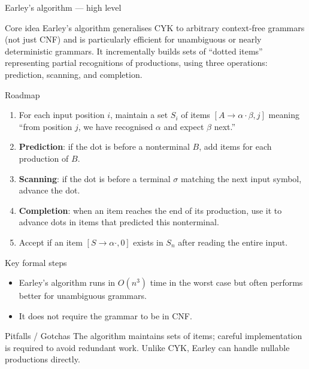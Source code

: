 \begin{frame}[t]{Earley’s algorithm — high level}
  \begin{tblock}{Core idea}
    Earley’s algorithm generalises CYK to arbitrary context‑free
    grammars (not just CNF) and is particularly efficient for
    unambiguous or nearly deterministic grammars.  It incrementally
    builds sets of “dotted items” representing partial recognitions of
    productions, using three operations: prediction, scanning, and
    completion.
  \end{tblock}
  \begin{tblock}{Roadmap}
    \begin{enumerate}
      \item For each input position $i$, maintain a set $S_i$ of items
        $[A \rightarrow \alpha \cdot \beta, j]$ meaning “from position
        $j$, we have recognised $\alpha$ and expect $\beta$ next.”
      \item \textbf{Prediction}: if the dot is before a nonterminal $B$,
        add items for each production of $B$.
      \item \textbf{Scanning}: if the dot is before a terminal $\sigma$
        matching the next input symbol, advance the dot.
      \item \textbf{Completion}: when an item reaches the end of its
        production, use it to advance dots in items that predicted this
        nonterminal.
      \item Accept if an item $[S \rightarrow \alpha \cdot,0]$ exists in
        $S_n$ after reading the entire input.
    \end{enumerate}
  \end{tblock}
  \begin{tblock}{Key formal steps}
    \begin{itemize}
      \item Earley’s algorithm runs in $O(n^3)$ time in the worst case
        but often performs better for unambiguous grammars.
      \item It does not require the grammar to be in CNF.
    \end{itemize}
  \end{tblock}
  \begin{talert}{Pitfalls / Gotchas}
    The algorithm maintains sets of items; careful implementation is
    required to avoid redundant work.  Unlike CYK, Earley can handle
    nullable productions directly.
  \end{talert}
  \label{fr:6.3-05}
\end{frame}

